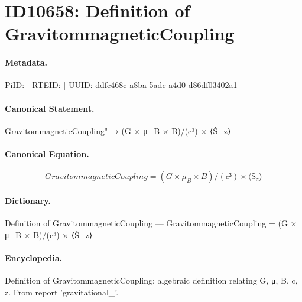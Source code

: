 \section*{ID10658: Definition of GravitommagneticCoupling}
\paragraph{Metadata.}
PiID:  | RTEID:  | UUID: ddfc468c-a8ba-5adc-a4d0-d86df03402a1

\paragraph{Canonical Statement.}
GravitommagneticCoupling" → (G × μ\_B × B)/(c³) × ⟨Ŝ\_z⟩

\paragraph{Canonical Equation.}
\[
GravitommagneticCoupling = (G × μ_B × B)/(c³) × ⟨Ŝ_z⟩
\]

\paragraph{Dictionary.}
Definition of GravitommagneticCoupling — GravitommagneticCoupling = (G × μ\_B × B)/(c³) × ⟨Ŝ\_z⟩

\paragraph{Encyclopedia.}
Definition of GravitommagneticCoupling: algebraic definition relating G, μ, B, c, z. From report 'gravitational\_'.
